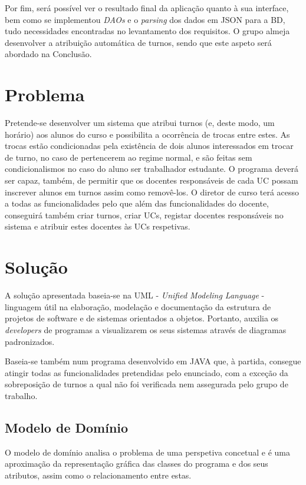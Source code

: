 \documentclass[a4paper]{article}
\begin{document}
Por fim, será possível ver o resultado final da aplicação quanto à sua interface, bem como se implementou \textit{DAOs} e o \textit{parsing} dos dados em JSON para a BD, tudo necessidades encontradas no levantamento dos requisitos. O grupo almeja desenvolver a atribuição automática de turnos, sendo que este aspeto será abordado na Conclusão.

\section{Problema}
\label{sec:2}

\hspace{3mm}

\hspace{3mm}Pretende-se desenvolver um sistema que atribui turnos (e, deste modo, um horário) aos alunos do curso e possibilita a ocorrência de trocas entre estes. As trocas estão condicionadas pela existência de dois alunos interessados em trocar de turno, no caso de pertencerem ao regime normal, e são feitas sem condicionalismos no caso do aluno ser trabalhador estudante. O programa deverá ser capaz, também, de permitir que os docentes responsáveis de cada UC possam inscrever alunos em turnos assim como removê-los. O diretor de curso terá acesso a todas as funcionalidades pelo que além das funcionalidades do docente, conseguirá também criar turnos, criar UCs, registar docentes responsáveis no sistema e atribuir estes docentes às UCs respetivas.

\clearpage
\section{Solução}
\label{sec:3}


\hspace{3mm}A solução apresentada baseia-se na UML - \emph{Unified Modeling Language} - linguagem útil na elaboração, modelação e documentação da estrutura de projetos de software e de sistemas orientados a objetos. Portanto, auxilia os \emph{developers} de programas a visualizarem os seus sistemas através de diagramas padronizados.

Baseia-se também num programa desenvolvido em JAVA que, à partida, consegue atingir todas as funcionalidades pretendidas pelo enunciado, com a exceção da sobreposição de turnos a qual não foi verificada nem assegurada pelo grupo de trabalho.

\pagebreak
\subsection{Modelo de Domínio}
\hspace{3mm}O modelo de domínio analisa o problema de uma perspetiva concetual e é uma aproximação da representação gráfica das classes do programa e dos seus atributos, assim como o relacionamento entre estas.
\end{document}
